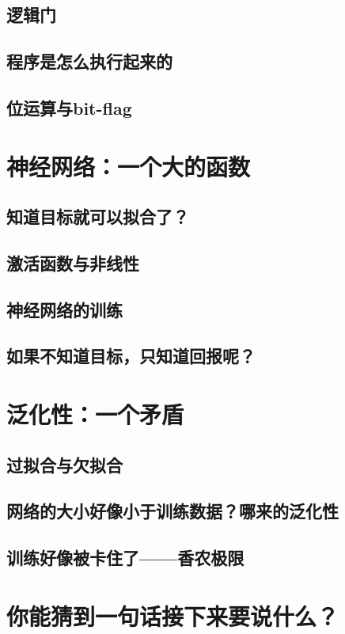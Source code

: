 \documentclass[UTF8, 12pt]{article}
\begin{document}
\subsection{逻辑门}
\subsection{程序是怎么执行起来的}
\subsection{位运算与bit-flag}

\section{神经网络：一个大的函数}
\subsection{知道目标就可以拟合了？}
\subsection{激活函数与非线性}
\subsection{神经网络的训练}
\subsection{如果不知道目标，只知道回报呢？}

\section{泛化性：一个矛盾}
\subsection{过拟合与欠拟合}
\subsection{网络的大小好像小于训练数据？哪来的泛化性}
\subsection{训练好像被卡住了——香农极限}

\section{你能猜到一句话接下来要说什么？}
\end{document}
